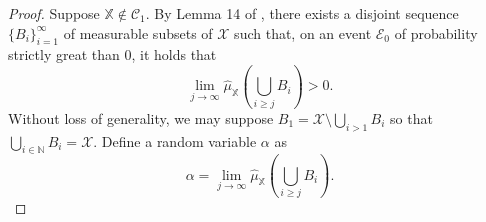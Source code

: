 \documentclass[aos]{imsart}
\theoremstyle{plain}
\theoremstyle{remark}
\newcommand{\1}{\mathbbm{1}}%
\newcommand{\Event}{\mathscr{E}}
\newcommand{\X}{\mathcal X}
\newcommand{\nats}{\mathbb{N}}
\newcommand{\ProcX}{\mathbb{X}}
\newcommand{\KC}{\mathcal{C}_{1}}
\begin{document}
\begin{proof}
Suppose $\ProcX \notin \KC$.
By Lemma 14 of \citep*{hanneke:21}, 
there exists a disjoint sequence $\{B_i\}_{i=1}^{\infty}$ 
of measurable subsets of $\X$  
such that, on an event $\Event_0$ of probability strictly great than $0$, 
it holds that 
\begin{equation*}
\lim_{j \to \infty} \hat{\mu}_{\ProcX}\!\left( \bigcup_{i \geq j} B_i \right) > 0.
\end{equation*}
Without loss of generality, we may suppose 
$B_1 = \X \setminus \bigcup\limits_{i > 1} B_i$ 
so that $\bigcup\limits_{i \in \nats} B_i = \X$.
Define a random variable $\alpha$ as 
\begin{equation*}
\alpha = \lim_{j \to \infty} \hat{\mu}_{\ProcX}\!\left( \bigcup_{i \geq j} B_i \right).
\end{equation*}


\end{proof}
\end{document}
